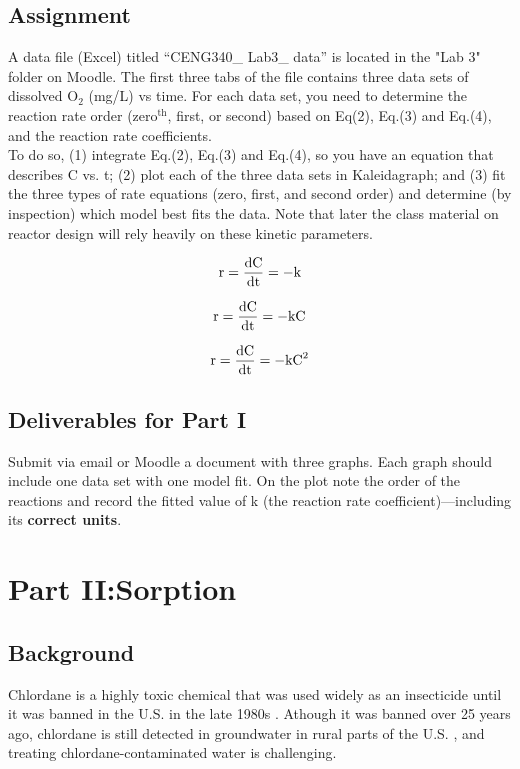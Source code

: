 \documentclass[12pt,letterpaper]{article}
\begin{document}
\subsection *{Assignment}

A data file (Excel) titled ``CENG340\_ Lab3\_ data'' is located in the "Lab 3" folder on Moodle.  The first three tabs of the file contains three data sets of dissolved O$_2$ (mg/L) vs time.  For each data set, you need to determine the reaction rate order (zero$\mathrm{^{th}}$, first, or second) based on Eq(2), Eq.(3) and Eq.(4), and the reaction rate coefficients.\\

To do so, (1) integrate Eq.(2), Eq.(3) and Eq.(4), so you have an equation that describes C vs. t; (2) plot each of the three data sets in Kaleidagraph; and (3) fit the three types of rate equations (zero, first, and second order) and determine (by inspection) which model best fits the data. Note that later the class material on reactor design will rely heavily on these kinetic parameters.

\begin{align}
\cee{r = \frac{dC}{dt} = -k}
\end{align}

\begin{align}
\cee{r = \frac{dC}{dt} = -kC}
\end{align}

\begin{align}
\cee{r = \frac{dC}{dt} = -kC^2}
\end{align}


\subsection *{Deliverables for Part I}
Submit via email or Moodle a document with three graphs.  Each graph should include one data set with one model fit.  On the plot note the order of the reactions and record the fitted value of k (the reaction rate coefficient)---including its \textbf{correct units}.  


\section *{\textbf{Part II:}Sorption}

\subsection *{Background}
Chlordane is a highly toxic chemical that was used widely as an insecticide until it was banned in the U.S. in the late 1980s \cite{army2009}.  Athough it was banned over 25 years ago, chlordane is still detected in groundwater in rural parts of the U.S. \cite{bidel2004}, and treating chlordane-contaminated water is challenging.
\end{document}
